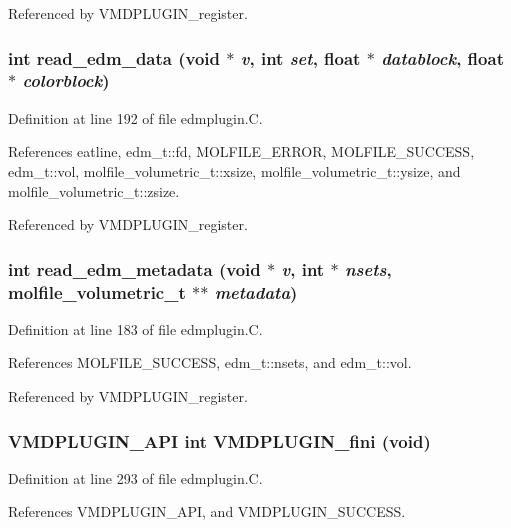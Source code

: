 Referenced by VMDPLUGIN\_\-register.
\subsubsection{\setlength{\rightskip}{0pt plus 5cm}int read\_\-edm\_\-data (void $\ast$ {\em v}, int {\em set}, float $\ast$ {\em datablock}, float $\ast$ {\em colorblock})\hspace{0.3cm}{\tt  [static]}}\label{edmplugin_8C_a4}




Definition at line 192 of file edmplugin.C.

References eatline, edm\_\-t::fd, MOLFILE\_\-ERROR, MOLFILE\_\-SUCCESS, edm\_\-t::vol, molfile\_\-volumetric\_\-t::xsize, molfile\_\-volumetric\_\-t::ysize, and molfile\_\-volumetric\_\-t::zsize.

Referenced by VMDPLUGIN\_\-register.
\subsubsection{\setlength{\rightskip}{0pt plus 5cm}int read\_\-edm\_\-metadata (void $\ast$ {\em v}, int $\ast$ {\em nsets}, {\bf molfile\_\-volumetric\_\-t} $\ast$$\ast$ {\em metadata})\hspace{0.3cm}{\tt  [static]}}\label{edmplugin_8C_a3}




Definition at line 183 of file edmplugin.C.

References MOLFILE\_\-SUCCESS, edm\_\-t::nsets, and edm\_\-t::vol.

Referenced by VMDPLUGIN\_\-register.
\subsubsection{\setlength{\rightskip}{0pt plus 5cm}VMDPLUGIN\_\-API int VMDPLUGIN\_\-fini (void)}\label{edmplugin_8C_a7}




Definition at line 293 of file edmplugin.C.

References VMDPLUGIN\_\-API, and VMDPLUGIN\_\-SUCCESS.
